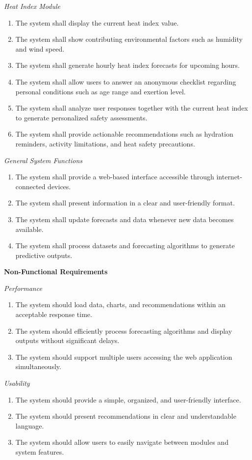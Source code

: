\documentclass[12pt]{article}
\begin{document}
\noindent\textit{Heat Index Module}
\begin{enumerate}
    \item The system shall display the current heat index value.
    \item The system shall show contributing environmental factors such as humidity and wind speed.
    \item The system shall generate hourly heat index forecasts for upcoming hours.
    \item The system shall allow users to answer an anonymous checklist regarding personal conditions such as age range and exertion level.
    \item The system shall analyze user responses together with the current heat index to generate personalized safety assessments.
    \item The system shall provide actionable recommendations such as hydration reminders, activity limitations, and heat safety precautions.
\end{enumerate}

\noindent\textit{General System Functions}
\begin{enumerate}
    \item The system shall provide a web-based interface accessible through internet-connected devices.
    \item The system shall present information in a clear and user-friendly format.
    \item The system shall update forecasts and data whenever new data becomes available.
    \item The system shall process datasets and forecasting algorithms to generate predictive outputs.
\end{enumerate}

\bigskip
\noindent\textbf{Non-Functional Requirements}

\medskip
\noindent\textit{Performance}
\begin{enumerate}
    \item The system should load data, charts, and recommendations within an acceptable response time.
    \item The system should efficiently process forecasting algorithms and display outputs without significant delays.
    \item The system should support multiple users accessing the web application simultaneously.
\end{enumerate}

\noindent\textit{Usability}
\begin{enumerate}
    \item The system should provide a simple, organized, and user-friendly interface.
    \item The system should present recommendations in clear and understandable language.
    \item The system should allow users to easily navigate between modules and system features.
\end{enumerate}
\end{document}
